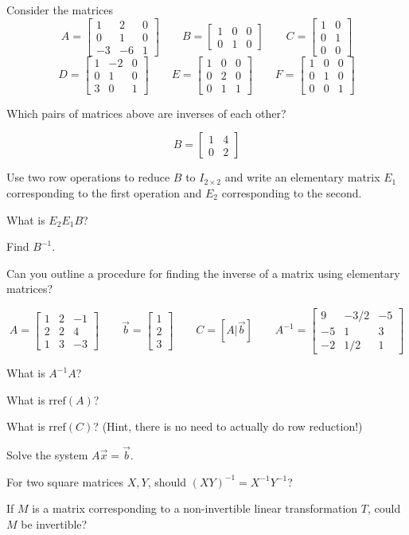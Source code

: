 \documentclass{problemset}
\newcommand{\rref}{\mathrm{rref}}
\newcommand{\mat}[1]{\begin{bmatrix}#1\end{bmatrix}}
\begin{document}
	\question
	Consider the matrices 
	\[
		A=\mat{1&2&0\\0&1&0\\-3&-6&1}\qquad
		B=\mat{1&0&0\\0&1&0}\qquad
		C=\mat{1&0\\0&1\\0&0}
	\]
	\[
		D=\mat{1&-2&0\\0&1&0\\3&0&1}\qquad
		E=\mat{1&0&0\\0&2&0\\0&1&1}\qquad
		F=\mat{1&0&0\\0&1&0\\0&0&1}
	\]
	\begin{parts}
		\item Which pairs of matrices above are inverses of each other?
	\end{parts}

	\question
	\[
		B=\mat{1 &4\\0 &2}
	\]
	\begin{parts}
		\item Use two row operations to reduce $B$ to $I_{2\times 2}$
		and write an elementary matrix $E_1$ corresponding to the first operation
		and $E_2$ corresponding to the second.
		\item What is $E_2E_1B$?
		\item Find $B^{-1}$.
		\item Can you outline a procedure for finding the inverse of a matrix
		using elementary matrices?
	\end{parts}

	\question
	\[
		A=\mat{1&2&-1\\2&2&4\\1&3&-3}\qquad
		\vec b=\mat{1\\2\\3}\qquad
		C=[A|\vec b]\qquad
		A^{-1}=\mat{9&-3/2&-5\\-5&1&3\\-2&1/2&1}
	\]
	\begin{parts}
		\item What is $A^{-1}A$?
		\item What is $\rref(A)$?
		\item What is $\rref(C)$? (Hint, there is no need to actually do row reduction!)
		\item Solve the system $A\vec x=\vec b$.
	\end{parts}

	\question
	\begin{parts}
		\item For two square matrices $X,Y$, should $(XY)^{-1}=X^{-1}Y^{-1}$?
		\item If $M$ is a matrix corresponding to a non-invertible linear transformation $T$,
			could $M$ be invertible?
	\end{parts}
\end{document}
